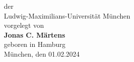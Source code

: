 \begin{titlepage}
\begin{center}
        \hspace*{-0.5cm}der\\
        \vspace*{0.1cm}
        \hspace*{-0.73cm}
        \hspace*{-0.5cm}Ludwig-Maximilians-Universität München\\
        \vspace*{3.5cm}
        \large
        \hspace*{-0.73cm}
        \hspace*{-0.8cm} vorgelegt von\\
        \vspace*{0.1cm}
        \hspace*{-0.73cm}
        \hspace*{-0.7cm}\Large \textbf{Jonas C. Märtens}\\
        \vspace*{0.15cm}
        \large
        \hspace*{-0.73cm}
        \hspace*{-0.8cm} geboren in Hamburg\\
        \vspace*{2.5cm}
        \vspace*{0.4cm}
        \hspace*{-0.73cm}
        \hspace*{-0.43cm}München, den 01.02.2024\\
    \end{center}
\end{titlepage}


%
%
\clearpage{\pagestyle{empty}\cleardoublepage}
%



\cleardoublepage

\tableofcontents
\cleardoublepage
{}
\setcounter{page}{1}